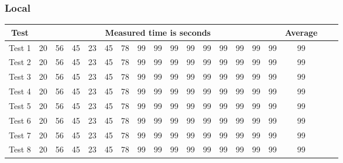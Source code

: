 \subsubsection{Local}
\begin{center}
    \begin{tabular}{| c | c | c | c | c | c | c | c | c | c | c | c | c | c | c | c | c | c | c |}
    \hline
    Test & \multicolumn{15}{|c|}{Measured time is seconds} & Average \\ \hline
    Test 1 & 20 & 56 & 45 & 23 & 45 & 78 & 99 & 99 & 99 & 99 & 99 & 99 & 99 & 99 & 99 & 99 \\ \hline
    Test 2 & 20 & 56 & 45 & 23 & 45 & 78 & 99 & 99 & 99 & 99 & 99 & 99 & 99 & 99 & 99 & 99 \\ \hline
    Test 3 & 20 & 56 & 45 & 23 & 45 & 78 & 99 & 99 & 99 & 99 & 99 & 99 & 99 & 99 & 99 & 99 \\ \hline
    Test 4 & 20 & 56 & 45 & 23 & 45 & 78 & 99 & 99 & 99 & 99 & 99 & 99 & 99 & 99 & 99 & 99 \\ \hline
    Test 5 & 20 & 56 & 45 & 23 & 45 & 78 & 99 & 99 & 99 & 99 & 99 & 99 & 99 & 99 & 99 & 99 \\ \hline
    Test 6 & 20 & 56 & 45 & 23 & 45 & 78 & 99 & 99 & 99 & 99 & 99 & 99 & 99 & 99 & 99 & 99 \\ \hline
    Test 7 & 20 & 56 & 45 & 23 & 45 & 78 & 99 & 99 & 99 & 99 & 99 & 99 & 99 & 99 & 99 & 99 \\ \hline
    Test 8 & 20 & 56 & 45 & 23 & 45 & 78 & 99 & 99 & 99 & 99 & 99 & 99 & 99 & 99 & 99 & 99 \\ \hline
    \end{tabular}
\end{center}
